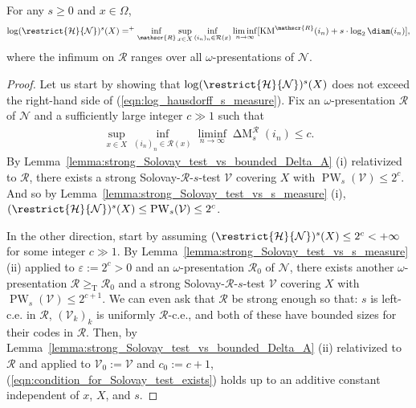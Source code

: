 \begin{theorem} 
    \label{theorem:point_to_set_s_measure}
    For any $s \geq 0$ and $x \in \Omega$,
    \begin{align}
        \label{eqn:log_hausdorff_s_measure}
        \log (\restrict{\mathcal{H}}{\mathcal{N}})^s(X) =^+ \inf_{\mathscr{R}} \sup_{x \in X} \inf_{(i_n)_n \in \mathcal{R}(x)} \liminf_{n \to \infty} [\operatorname{KM}^{\mathscr{R}}(i_n) + s \cdot \log_2 \diam(i_n)],
    \end{align}
    where the infimum on $\mathscr{R}$ ranges over all $\omega$-presentations of $\mathcal{N}$.
\end{theorem}
\begin{proof}
    Let us start by showing that $\log (\restrict{\mathcal{H}}{\mathcal{N}})^s(X)$ does not exceed the right-hand side of (\ref{eqn:log_hausdorff_s_measure}). Fix an $\omega$-presentation $\mathscr{R}$ of $\mathcal{N}$ and a sufficiently large integer $c \gg 1$ such that
    \begin{align}
    \label{eqn:condition_for_Solovay_test_exists}
        \sup_{x \in X} \inf_{(i_n)_n \in \mathcal{R}(x)} \liminf_{n \to \infty} \operatorname{\Delta M}^{\mathscr{R}}_s(i_n) \leq c.
    \end{align}
    By Lemma~\ref{lemma:strong_Solovay_test_vs_bounded_Delta_A} (i) relativized to $\mathscr{R}$, there exists a strong Solovay-$\mathscr{R}$-$s$-test $\mathcal{V}$ covering $X$ with $\operatorname{PW}_s(\mathcal{V}) \leq 2^c$. And so by Lemma~\ref{lemma:strong_Solovay_test_vs_s_measure} (i), $(\restrict{\mathcal{H}}{\mathcal{N}})^s(X) \leq \operatorname{PW}_s(\mathcal{V}) \leq 2^c$.

    In the other direction, start by assuming $(\restrict{\mathcal{H}}{\mathcal{N}})^s(X) \leq 2^c < +\infty$ for some integer $c \gg 1$. By Lemma~\ref{lemma:strong_Solovay_test_vs_s_measure} (ii) applied to $\varepsilon := 2^c > 0$ and an $\omega$-presentation $\mathscr{R}_0$ of $\mathcal{N}$, there exists another $\omega$-presentation $\mathscr{R} \geq_{\operatorname{T}} \mathscr{R}_0$ and a strong Solovay-$\mathscr{R}$-$s$-test $\mathcal{V}$ covering $X$ with $\operatorname{PW}_s(\mathcal{V}) \leq 2^{c + 1}$. We can even ask that $\mathscr{R}$ be strong enough so that: $s$ is left-c.e. in $\mathscr{R}$, $(\mathcal{V}_k)_k$ is uniformly $\mathscr{R}$-c.e., and both of these have bounded sizes for their codes in $\mathscr{R}$. Then, by Lemma~\ref{lemma:strong_Solovay_test_vs_bounded_Delta_A} (ii) relativized to $\mathscr{R}$ and applied to $\mathcal{V}_0 := \mathcal{V}$ and $c_0 := c + 1$, (\ref{eqn:condition_for_Solovay_test_exists}) holds up to an additive constant independent of $x$, $X$, and $s$.
\end{proof}

